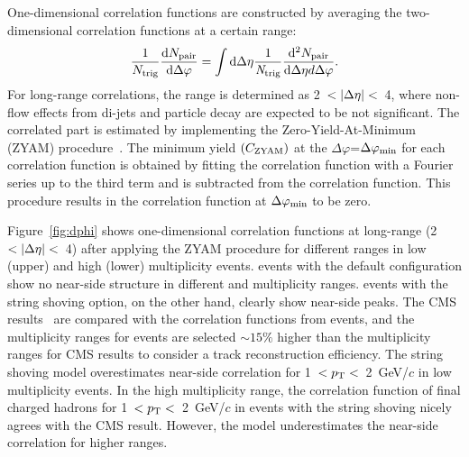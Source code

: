One-dimensional \dphi correlation functions are constructed by averaging the two-dimensional correlation functions at a certain \deta range:
\begin{align}
\frac{1}{N_{\mathrm{trig}}} \frac{ \mathrm{d} N_{\mathrm{pair}} }{ \mathrm{d}\Delta\varphi } = \int \mathrm{d} \Delta \eta \frac{1}{\it{N}_{\mathrm{trig}}} \frac{ \mathrm{d}^{2} N_{\mathrm{pair}} }{ \mathrm{d}\Delta\eta d\Delta\varphi}.
\end{align}
For long-range correlations, the \deta range is determined as 2~$<|\deta|<$~4, where non-flow effects from di-jets and particle decay are expected to be not significant. 
The correlated part is estimated by implementing the Zero-Yield-At-Minimum (ZYAM) procedure~\cite{Ajitanand:2005jj}.
The minimum yield $(C_{\rm{ZYAM}})$ at the $\Delta\varphi$=$\Delta\varphi_{\rm{min}}$ for each \dphi correlation function is obtained by fitting the \dphi correlation function with a Fourier series up to the third term and is subtracted from the \dphi correlation function.
This procedure results in the \dphi correlation function at $\Delta\varphi_{\rm{min}}$ to be zero.

Figure~\ref{fig:dphi} shows one-dimensional \dphi correlation functions at long-range (2~$<|\deta|<$~4) after applying the ZYAM procedure for different \pt ranges in low (upper) and high (lower) multiplicity events.
\pythia events with the default configuration show no near-side structure in different \pt and multiplicity ranges. 
\pythia events with the string shoving option, on the other hand, clearly show near-side peaks.
The CMS results~\cite{Khachatryan:2015lva} are compared with the correlation functions from \pythia events, and the multiplicity ranges for \pythia events are selected $\sim15\%$ higher than the multiplicity ranges for CMS results to consider a track reconstruction efficiency.
The string shoving model overestimates near-side correlation for 1~$<\mbox{$p_{\mathrm{T}}$}<$~2~GeV/$c$ in low multiplicity events.
In the high multiplicity range, the correlation function of final charged hadrons for 1~$<\mbox{$p_{\mathrm{T}}$}<$~2~GeV/$c$ in \pythia events with the string shoving nicely agrees with the CMS result.
However, the model underestimates the near-side correlation for higher \pt ranges. 


